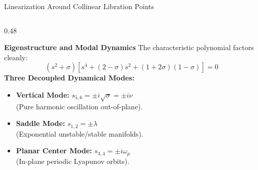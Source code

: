 \documentclass[aspectratio=169, 10pt]{beamer}
\begin{document}
\begin{frame}{Linearization Around Collinear Libration Points}
\begin{columns}[t]
        \begin{column}{0.48\textwidth}
            \begin{block}{\textbf{Eigenstructure and Modal Dynamics}}
                \scriptsize
                The characteristic polynomial factors cleanly:
                \begin{equation*}
                    (s^2 + \sigma)\left[ s^4 + (2-\sigma)s^2 + (1+2\sigma)(1-\sigma) \right] = 0
                \end{equation*}
                \textbf{Three Decoupled Dynamical Modes:}
                \begin{itemize}\setlength{\itemsep}{2pt}
                    \item \textbf{Vertical Mode:} $s_{5,6} = \pm i\sqrt{\sigma} = \pm i\nu$ \\
                    (Pure harmonic oscillation out-of-plane).
                    \item \textbf{Saddle Mode:} $s_{1,2} = \pm \lambda$ \\
                    (Exponential unstable/stable manifolds).
                    \item \textbf{Planar Center Mode:} $s_{3,4} = \pm i\omega_p$ \\
                    (In-plane periodic Lyapunov orbits).
                \end{itemize}
            \end{block}
        \end{column}
    \end{columns}
\end{frame}
\end{document}
